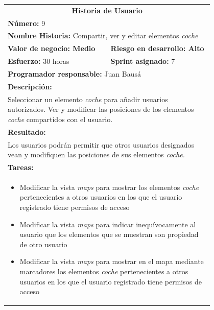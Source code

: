 	\begin{table}[H]
	  \centering 
	 	\begin{tabular}{p{0.4\linewidth}p{0.4\linewidth}}
	    \toprule
	    \multicolumn{2}{c}{\cellcolor{black!30}\textbf{Historia de Usuario}} 													\\
		\multicolumn{2}{l}{\cellcolor{gray!25}\textbf{Número: }9}																\\
		\multicolumn{2}{l}{\textbf{Nombre Historia: } Compartir, ver y editar elementos \textit{coche}}						\\
		\cellcolor{gray!25}\textbf{Valor de negocio: Medio}	&	\cellcolor{gray!25}\textbf{Riesgo en desarrollo: Alto}		\\
		\textbf{Esfuerzo:} 30 horas				&	\textbf{Sprint asignado: }7 												\\
		\multicolumn{2}{l}{\cellcolor{gray!25}\textbf{Programador responsable: }Juan Bausá}									\\
		\multicolumn{2}{l}{\textbf{Descripción:}}                                                     						\\
		\multicolumn{2}{l}{\parbox{15cm}{Seleccionar un elemento \textit{coche} para añadir usuarios autorizados. Ver y modificar las posiciones de los elementos \textit{coche} compartidos con el usuario.}}				\\
		\multicolumn{2}{l}{\cellcolor{gray!25}\textbf{Resultado:}}																\\		
		\multicolumn{2}{l}{\parbox{15cm}{Los usuarios podrán permitir que otros usuarios designados vean y modifiquen las posiciones de sus elementos \textit{coche.}}}																								\\
		\multicolumn{2}{l}{\textbf{Tareas:}}																					\\
		\multicolumn{2}{l}{
			\begin{minipage}{12cm}
	    		\vskip 4pt
	    		\begin{itemize}
	    			\item Modificar la vista \textit{maps} para mostrar los elementos \textit{coche} pertenecientes a otros usuarios en los que el usuario registrado tiene permisos de acceso
	    			\item Modificar la vista \textit{maps} para indicar inequívocamente al usuario que los elementos que se muestran son propiedad de otro usuario
	    			\item Modificar la vista \textit{maps} para mostrar en el mapa mediante marcadores los elementos \textit{coche} pertenecientes a otros usuarios en los que el usuario registrado tiene permisos de acceso

\end{itemize}
\end{minipage}}
\end{tabular}
\end{table}
